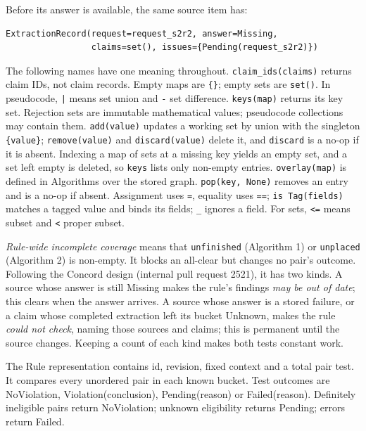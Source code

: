 \documentclass[11pt]{article}
\newcommand{\code}[1]{\texttt{#1}}
\begin{document}
Before its answer is available, the same source item has:

\begin{minipage}{\linewidth}{\small
\begin{verbatim}
ExtractionRecord(request=request_s2r2, answer=Missing,
                 claims=set(), issues={Pending(request_s2r2)})
\end{verbatim}}\end{minipage}

The following names have one meaning throughout. \code{claim\_ids(claims)}
returns claim IDs, not claim records. Empty maps are \code{\{\}}; empty sets are
\code{set()}. In pseudocode, \code{|} means set union and \code{-} set
difference. \code{keys(map)} returns its key set. Rejection sets are immutable
mathematical values; pseudocode collections may contain them. \code{add(value)}
updates a working set by union with the singleton \code{\{value\}};
\code{remove(value)} and \code{discard(value)} delete it, and \code{discard}
is a no-op if it is absent. Indexing a map of sets at a missing key yields an
empty set, and a set left empty is deleted, so \code{keys} lists only non-empty
entries. \code{overlay(map)} is defined in Algorithms over the stored graph.
\code{pop(key, None)} removes an entry and is a no-op if absent. Assignment
uses \code{=}, equality uses \code{==}; \code{is Tag(fields)} matches a tagged
value and binds its fields; \code{\_} ignores a field. For sets, \code{<=}
means subset and \code{<} proper subset.

\emph{Rule-wide incomplete coverage} means that \code{unfinished} (Algorithm 1)
or \code{unplaced} (Algorithm 2) is non-empty. It blocks an all-clear but
changes no pair's outcome. Following the
Concord design (internal pull request 2521), it has two
kinds. A source whose answer is still Missing makes the rule's findings
\emph{may be out of date}; this clears when the answer arrives. A source whose
answer is a stored failure, or a claim whose completed extraction left its
bucket Unknown, makes the rule \emph{could not check}, naming those sources and
claims; this is permanent until the source changes. Keeping a count of each
kind makes both tests constant work.

The Rule representation contains id, revision, fixed context and a total pair test. It
compares every unordered pair in each known bucket. Test outcomes are
NoViolation, Violation(conclusion), Pending(reason) or Failed(reason).
Definitely ineligible pairs return NoViolation; unknown eligibility returns
Pending; errors return Failed.
\end{document}
